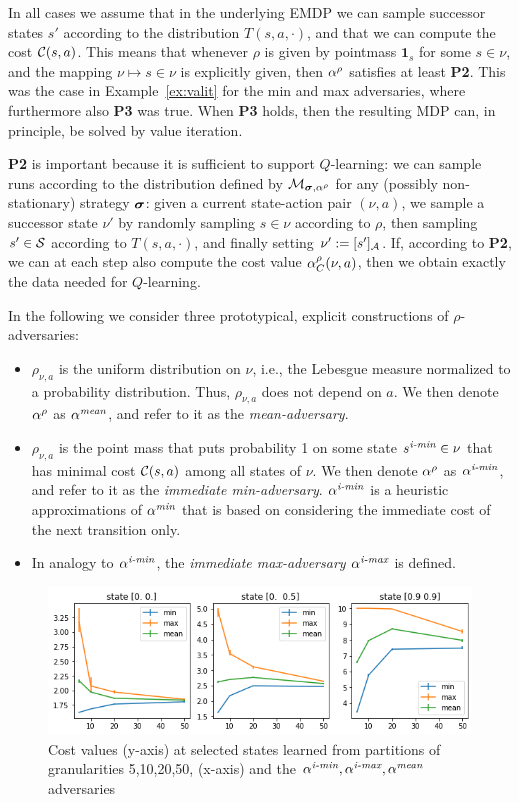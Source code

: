 \documentclass{llncs}
\begin{document}
In all cases we assume that in the underlying EMDP we can sample successor states $s'$ according to
the distribution $T(s,a,\cdot)$, and that we can compute the cost $\mathcal{C}(s,a)$. This means that
whenever $\rho$ is given by pointmass ${\boldsymbol 1}_s$ for some $s\in\nu$, and the mapping
$\nu\mapsto s\in\nu$ is explicitly given, then $\alpha^{\rho}$ satisfies at least {\bf P2}.
This was the case in Example~\ref{ex:valit} for the min and max adversaries, where furthermore also
{\bf P3} was true. When {\bf P3} holds, then the resulting MDP can, in principle,
be solved by value iteration.

{\bf P2} is important because it is sufficient to support $Q$-learning: we can sample runs according to
the distribution
defined by $\mathcal{M}_{\boldsymbol{\sigma},\alpha^{\rho}}$ for any (possibly non-stationary) strategy $\boldsymbol{\sigma}$:
given a current state-action pair $(\nu,a)$, we sample a successor state $\nu'$ by randomly sampling
$s\in\nu$ according to $\rho$, then sampling $s'\in\mathcal{S}$ according to $T(s,a,\cdot)$, and finally
setting $\nu':=[s']_{\mathcal{A}}$. If, according to {\bf P2}, we can at each step also compute the cost
value $\alpha^{\rho}_C(\nu,a)$, then we obtain exactly the data needed for $Q$-learning. 

In the following we consider three prototypical, explicit constructions of $\rho$-adversaries:
\begin{itemize}
\item $\rho_{\nu,a}$ is the uniform distribution on $\nu$, i.e., the Lebesgue measure normalized to a probability
distribution. Thus, $\rho_{\nu,a}$ does not depend on $a$. We then denote $\alpha^{\rho}$ as $\alpha^{\emph{mean}}$, and refer to
it as the \emph{mean-adversary}.
\item $\rho_{\nu,a}$ is the point mass that puts probability 1 on some state $s^{\emph{i-min}}\in\nu$ that has minimal
cost  $\mathcal{C}(s,a)$ among all states of $\nu$.   We then denote $\alpha^{\rho}$ as $\alpha^{\emph{i-min}}$, and refer to
it as the \emph{immediate min-adversary}. $\alpha^{\emph{i-min}}$ is a heuristic approximations of  $\alpha^{\emph{min}}$ that
is based on considering the immediate cost of the next transition only.
\item In analogy to $\alpha^{\emph{i-min}}$, the \emph{immediate max-adversary} $\alpha^{\emph{i-max}}$ is defined.
\end{itemize}

\begin{figure}[b]
\centering
\includegraphics[scale=0.5]{./Figures/minmaxmean2d+err.png}
\caption{Cost values (y-axis) at selected states learned from partitions of granularities 5,10,20,50, (x-axis)
and the $\alpha^{\emph{i-min}}, \alpha^{\emph{i-max}}, \alpha^{\emph{mean}}$ adversaries\label{fig:minmax2d}}
\end{figure}
\end{document}
